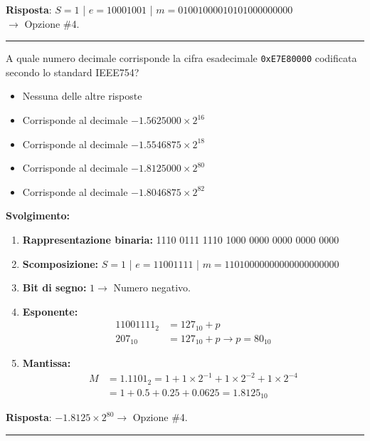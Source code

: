\documentclass[12pt, a4paper]{article}
\begin{document}
\textbf{Risposta}: 
$S=1$ | $e=10001001$ | $m=01001000010101000000000$ \\
$\rightarrow$ Opzione \#4.

\vspace{0.5cm}
\hrule
\vspace{0.5cm}

A quale numero decimale corrisponde la cifra esadecimale \texttt{0xE7E80000} codificata secondo lo standard IEEE754?
\begin{itemize}
    \item[$\square$] Nessuna delle altre risposte
    \item[$\square$] Corrisponde al decimale $-1.5625000 \times 2^{16}$
    \item[$\square$] Corrisponde al decimale $-1.5546875 \times 2^{18}$
    \item[$\blacksquare$] Corrisponde al decimale $-1.8125000 \times 2^{80}$
    \item[$\square$] Corrisponde al decimale $-1.8046875 \times 2^{82}$
\end{itemize}

\textbf{Svolgimento:}
\begin{enumerate}
    \item \textbf{Rappresentazione binaria:} 1110 0111 1110 1000 0000 0000 0000 0000
    \item \textbf{Scomposizione:} $S=1$ | $e=11001111$ | $m=11010000000000000000000$
    \item \textbf{Bit di segno:} $1 \rightarrow$ Numero negativo.
    \item \textbf{Esponente:} 
    \begin{align*}
    11001111_2 &= 127_{10} + p \\
    207_{10} &= 127_{10} + p \rightarrow p = 80_{10}
    \end{align*}
    \item \textbf{Mantissa:} 
    \begin{align*}
    M &= 1.1101_2 = 1 + 1\times2^{-1} + 1\times2^{-2} + 1\times2^{-4} \\
      &= 1 + 0.5 + 0.25 + 0.0625 = 1.8125_{10}
    \end{align*}
\end{enumerate}
\textbf{Risposta}: $-1.8125 \times 2^{80} \rightarrow$ Opzione \#4.

\vspace{0.5cm}
\hrule
\vspace{0.5cm}
\end{document}

